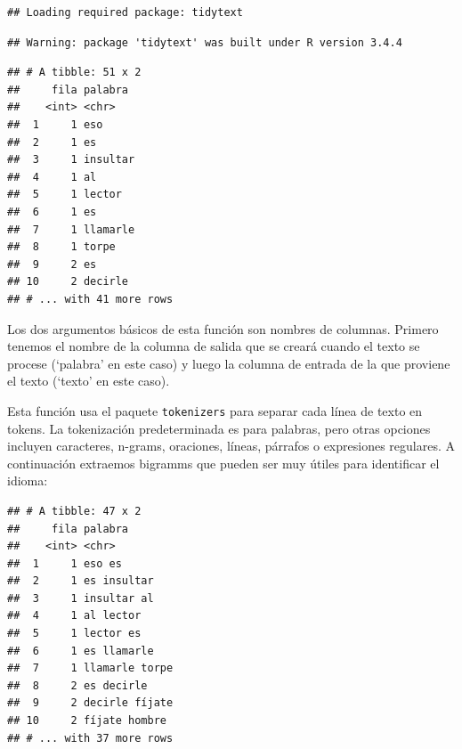 \documentclass[]{article}
\newenvironment{Shaded}{\begin{snugshade}}{\end{snugshade}}
\newcommand{\KeywordTok}[1]{\textcolor[rgb]{0.13,0.29,0.53}{\textbf{#1}}}
\newcommand{\DataTypeTok}[1]{\textcolor[rgb]{0.13,0.29,0.53}{#1}}
\newcommand{\DecValTok}[1]{\textcolor[rgb]{0.00,0.00,0.81}{#1}}
\newcommand{\StringTok}[1]{\textcolor[rgb]{0.31,0.60,0.02}{#1}}
\newcommand{\CommentTok}[1]{\textcolor[rgb]{0.56,0.35,0.01}{\textit{#1}}}
\newcommand{\OperatorTok}[1]{\textcolor[rgb]{0.81,0.36,0.00}{\textbf{#1}}}
\newcommand{\NormalTok}[1]{#1}
\begin{document}
\begin{verbatim}
## Loading required package: tidytext
\end{verbatim}

\begin{verbatim}
## Warning: package 'tidytext' was built under R version 3.4.4
\end{verbatim}

\begin{Shaded}
\end{Shaded}

\begin{verbatim}
## # A tibble: 51 x 2
##     fila palabra 
##    <int> <chr>   
##  1     1 eso     
##  2     1 es      
##  3     1 insultar
##  4     1 al      
##  5     1 lector  
##  6     1 es      
##  7     1 llamarle
##  8     1 torpe   
##  9     2 es      
## 10     2 decirle 
## # ... with 41 more rows
\end{verbatim}

Los dos argumentos básicos de esta función son nombres de columnas.
Primero tenemos el nombre de la columna de salida que se creará cuando
el texto se procese (`palabra' en este caso) y luego la columna de
entrada de la que proviene el texto (`texto' en este caso).

Esta función usa el paquete \texttt{tokenizers} para separar cada línea
de texto en tokens. La tokenización predeterminada es para palabras,
pero otras opciones incluyen caracteres, n-grams, oraciones, líneas,
párrafos o expresiones regulares. A continuación extraemos bigramms que
pueden ser muy útiles para identificar el idioma:

\begin{Shaded}
\end{Shaded}

\begin{verbatim}
## # A tibble: 47 x 2
##     fila palabra       
##    <int> <chr>         
##  1     1 eso es        
##  2     1 es insultar   
##  3     1 insultar al   
##  4     1 al lector     
##  5     1 lector es     
##  6     1 es llamarle   
##  7     1 llamarle torpe
##  8     2 es decirle    
##  9     2 decirle fíjate
## 10     2 fíjate hombre 
## # ... with 37 more rows
\end{verbatim}
\end{document}
